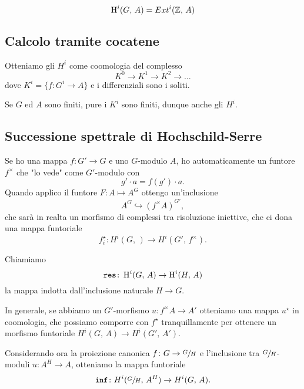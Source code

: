 \documentclass[a4paper]{article}
\begin{document}
	\begin{theorem}
		\[ \operatorname{H}^i(G, \, A) = Ext^i(\mathbb{Z}, \, A) \]
	\end{theorem}

	\subsection{Calcolo tramite cocatene}
	\begin{theorem}
		Otteniamo gli $ H^i $ come coomologia del complesso
		\[ K^0 \to K^1 \to K^2 \to \dots \]
		dove $ K^i = \{ f \colon G^i \to A \} $ e i differenziali sono i soliti.
	\end{theorem}

	\begin{theorem}
		Se $ G $ ed $ A $ sono finiti, pure i $ K^i $ sono finiti, dunque anche gli $ H^i. $
	\end{theorem}
	
	\subsection{Successione spettrale di Hochschild-Serre}
	Se ho una mappa $ f \colon G' \to G $ e uno $ G $-modulo $ A $, ho automaticamente un funtore $ f^\times $ che "lo vede" come $ G' $-modulo con
	\[ g' \cdot a = f(g') \cdot a. \]
	Quando applico il funtore $ F \colon A \mapsto A^G $ ottengo un'inclusione
	\[ A^G \hookrightarrow (f^\times A)^{G'}, \]
	che sarà in realta un morfismo di complessi tra risoluzione iniettive, che ci dona una mappa funtoriale $$  f_i^\star \colon H^i(G, \, ) \to H^i(G', \, f^\times ).  $$
	
	\begin{definition}[Restrizione]
		Chiamiamo $$  \operatorname{\texttt{res}} \colon \operatorname{H}^i(G, \, A) \to \operatorname{H}^i(H, \, A)  $$ la mappa indotta dall'inclusione naturale $ H \to G $.
	\end{definition}

	In generale, se abbiamo un $ G' $-morfismo $ u \colon f^\times A \to A'  $ otteniamo una mappa $ u^\star $ in coomologia, che possiamo comporre con $ f^\star $ tranquillamente per ottenere un morfismo funtoriale $ H^i(G, \, A) \to H^i(G', \, A') $.
	
	\begin{definition}[Inflazione]
		Considerando ora la proiezione canonica $ f \colon G \to \sfrac{G}{H} $ e l'inclusione tra $ \sfrac{G}{H} $-moduli $ u \colon A^H \to A $, otteniamo la mappa funtoriale \[ \operatorname{\texttt{inf}} \colon H^i(\sfrac{G}{H}, \, A^H) \to H^i(G, \, A). \]
	\end{definition}
	
\end{document}
